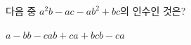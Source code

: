 다음 중 $a^2b-ac-ab^2+bc$의 인수인 것은?
\begin{choices32}{$a-b$}{$b-c$}{$ab+c$}{$a+bc$}{$b-ca$}\end{choices32}
